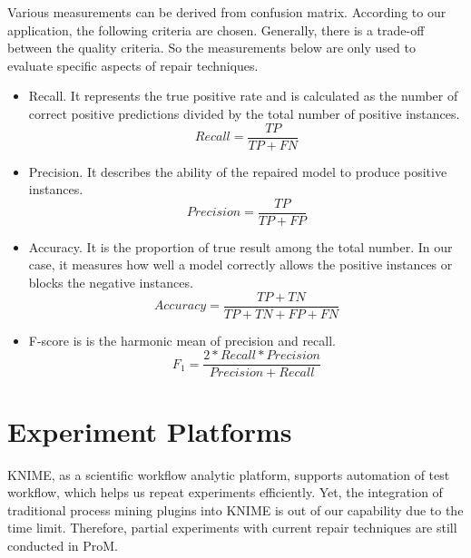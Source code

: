 Various measurements can be derived from confusion matrix. According to our application, the following criteria are chosen. Generally, there is a trade-off between the quality criteria. So the measurements below are only used to evaluate specific aspects of repair techniques.
\begin{itemize}
	\item Recall. It represents the true positive rate and is calculated as the number of correct positive predictions divided by the total number of positive instances.
	\[Recall = \frac{TP}{TP + FN}\]
	\item Precision. It describes the ability of the repaired model to produce positive instances.
	\[Precision = \frac{TP}{TP + FP }\]
	\item Accuracy. It is the proportion of true result among the total number. In our case, it measures how well a model correctly allows the positive instances or blocks the negative instances.
	\[Accuracy = \frac{TP+TN}{TP+TN+FP+FN}\]
	\item F-score is is the harmonic mean of precision and recall.
	\[F_1 = \frac{2*Recall*Precision}{Precision + Recall}\]
\end{itemize}

\section{Experiment Platforms}
KNIME, as a scientific workflow analytic platform, supports automation of test workflow, which helps us repeat experiments efficiently. Yet, the integration of traditional process mining plugins into KNIME is out of our capability due to the time limit. Therefore, partial experiments with current repair techniques are still conducted in ProM. 
